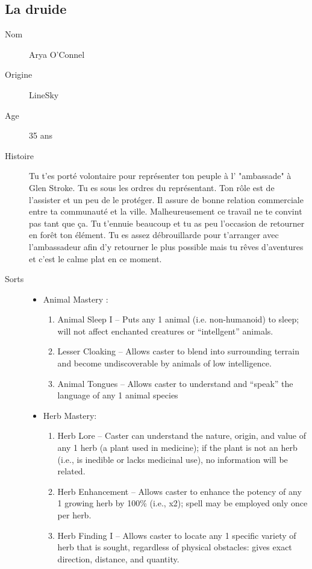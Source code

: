 \documentclass[oneside,12pt]{book}
\begin{document}
\begin{flushleft}
\subsection{La druide}
\begin{description}
\item[Nom]{Arya O'Connel}
\item[Origine]{LineSky}
\item[Age]{35 ans}
\item[Histoire]{
\small Tu t'es porté volontaire pour représenter ton peuple à l' "ambassade" à Glen Stroke. Tu es sous les ordres du représentant. Ton rôle est de l'assister et un peu de le protéger. Il assure de bonne relation commerciale entre ta communauté et la ville.
Malheureusement ce travail ne te convint pas tant que ça. Tu t'ennuie beaucoup et tu as peu l'occasion de retourner en forêt ton élément. Tu es assez débrouillarde pour t'arranger avec l'ambassadeur afin d'y retourner le plus possible mais tu rêves d'aventures et c'est le calme plat en ce moment. }
\item[Sorts]{
\begin{itemize}
\item Animal Mastery :
\begin{enumerate}
\scriptsize
\item Animal Sleep I – Puts any 1 animal (i.e. non-humanoid)
to sleep; will not affect enchanted creatures or
“intellgent” animals.
\item Lesser Cloaking – Allows caster to blend into
surrounding terrain and become undiscoverable by
animals of low intelligence.
\item Animal Tongues – Allows caster to understand and
“speak” the language of any 1 animal species
\end{enumerate}
\item Herb Mastery:
\begin{enumerate}
\scriptsize
\item Herb Lore – Caster can understand the nature, origin,
and value of any 1 herb (a plant used in medicine); if
the plant is not an herb (i.e., is inedible or lacks
medicinal use), no information will be related.
\item Herb Enhancement – Allows caster to enhance the
potency of any 1 growing herb by 100\% (i.e., x2); spell
may be employed only once per herb.
\item Herb Finding I – Allows caster to locate any 1 specific
variety of herb that is sought, regardless of physical
obstacles: gives exact direction, distance, and quantity.

\end{enumerate}
\end{itemize}}
\end{description}
\end{flushleft}
\end{document}
